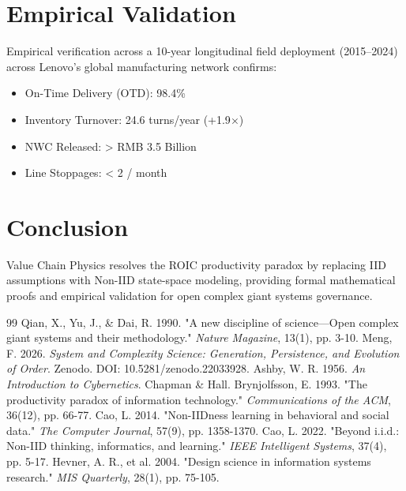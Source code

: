 \documentclass[11pt,a4paper]{article}
\begin{document}
\section{Empirical Validation}
Empirical verification across a 10-year longitudinal field deployment (2015--2024) across Lenovo's global manufacturing network confirms:
\begin{itemize}
    \item On-Time Delivery (OTD): 98.4\%
    \item Inventory Turnover: 24.6 turns/year (+1.9$\times$)
    \item NWC Released: > RMB 3.5 Billion
    \item Line Stoppages: < 2 / month
\end{itemize}

\section{Conclusion}
Value Chain Physics resolves the ROIC productivity paradox by replacing IID assumptions with Non-IID state-space modeling, providing formal mathematical proofs and empirical validation for open complex giant systems governance.

\begin{thebibliography}{99}
 Qian, X., Yu, J., \& Dai, R. 1990. "A new discipline of science—Open complex giant systems and their methodology." \textit{Nature Magazine}, 13(1), pp. 3-10.
 Meng, F. 2026. \textit{System and Complexity Science: Generation, Persistence, and Evolution of Order}. Zenodo. DOI: 10.5281/zenodo.22033928.
 Ashby, W. R. 1956. \textit{An Introduction to Cybernetics}. Chapman \& Hall.
 Brynjolfsson, E. 1993. "The productivity paradox of information technology." \textit{Communications of the ACM}, 36(12), pp. 66-77.
 Cao, L. 2014. "Non-IIDness learning in behavioral and social data." \textit{The Computer Journal}, 57(9), pp. 1358-1370.
 Cao, L. 2022. "Beyond i.i.d.: Non-IID thinking, informatics, and learning." \textit{IEEE Intelligent Systems}, 37(4), pp. 5-17.
 Hevner, A. R., et al. 2004. "Design science in information systems research." \textit{MIS Quarterly}, 28(1), pp. 75-105.
\end{thebibliography}
\end{document}
